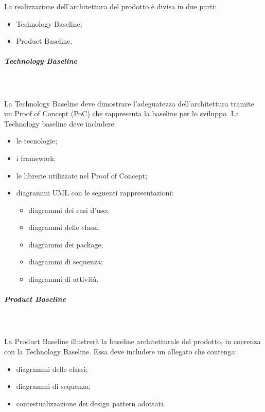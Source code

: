 La realizzazione dell’architettura del prodotto è divisa in due parti:
\begin{itemize}
	\item Technology Baseline;
	\item Product Baseline.
\end{itemize}

\subparagraph{Technology Baseline}\mbox{}\\ \\
La Technology Baseline deve dimostrare l’adeguatezza dell’architettura tramite un Proof of Concept (PoC) che rappresenta la baseline per lo sviluppo. 
La Technology baseline deve includere:
\begin{itemize}
	\item le tecnologie;
	\item i framework;
	\item le librerie utilizzate nel Proof of Concept;
	\item diagrammi UML con le seguenti rappresentazioni:
	\begin{itemize}
		\item diagrammi dei casi d'uso; 
		\item diagrammi delle classi; 
		\item diagrammi dei package;
		\item diagrammi di sequenza; 
		\item diagrammi di attività.
	\end{itemize}
\end{itemize}

\subparagraph{Product Baseline}\mbox{}\\ \\
La Product Baseline illustrerà la baseline architetturale del prodotto, in coerenza con la Technology Baseline.
Essa deve includere un allegato che contenga:
\begin{itemize}
	\item diagrammi delle classi;
	\item diagrammi di sequenza;
	\item contestualizzazione dei design pattern adottati.	
\end{itemize}

